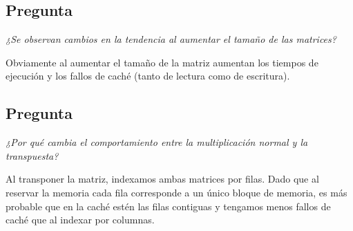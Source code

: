 \documentclass[nochap]{apuntes}
\begin{document}
\subsection{Pregunta}\emph{¿Se observan cambios en la tendencia al aumentar el tamaño de las matrices?}

Obviamente al aumentar el tamaño de la matriz aumentan los tiempos de ejecución y los fallos de caché (tanto de lectura como de escritura).

\subsection{Pregunta}\emph{¿Por qué cambia el comportamiento entre la multiplicación normal y la transpuesta?}

Al transponer la matriz, indexamos ambas matrices por filas. Dado que al reservar la memoria cada fila corresponde a un único bloque de memoria, es más probable que en la caché estén las filas contiguas y tengamos menos fallos de caché que al indexar por columnas.

 
\end{document}
